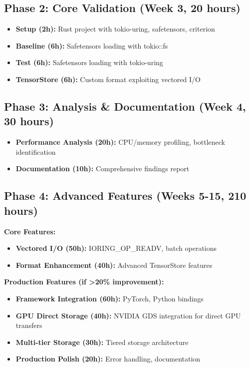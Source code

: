 \documentclass{article}
\begin{document}
\subsection{Phase 2: Core Validation (Week 3, 20 hours)}

\begin{itemize}
\item \textbf{Setup (2h):} Rust project with tokio-uring, safetensors, criterion
\item \textbf{Baseline (6h):} Safetensors loading with tokio::fs
\item \textbf{Test (6h):} Safetensors loading with tokio-uring
\item \textbf{TensorStore (6h):} Custom format exploiting vectored I/O
\end{itemize}

\subsection{Phase 3: Analysis \& Documentation (Week 4, 30 hours)}

\begin{itemize}
\item \textbf{Performance Analysis (20h):} CPU/memory profiling, bottleneck identification
\item \textbf{Documentation (10h):} Comprehensive findings report
\end{itemize}

\subsection{Phase 4: Advanced Features (Weeks 5-15, 210 hours)}

\textbf{Core Features:}
\begin{itemize}
\item \textbf{Vectored I/O (50h):} IORING\_OP\_READV, batch operations
\item \textbf{Format Enhancement (40h):} Advanced TensorStore features
\end{itemize}

\textbf{Production Features (if >20\% improvement):}
\begin{itemize}
\item \textbf{Framework Integration (60h):} PyTorch, Python bindings
\item \textbf{GPU Direct Storage (40h):} NVIDIA GDS integration for direct GPU transfers
\item \textbf{Multi-tier Storage (30h):} Tiered storage architecture
\item \textbf{Production Polish (20h):} Error handling, documentation
\end{itemize}
\end{document}
